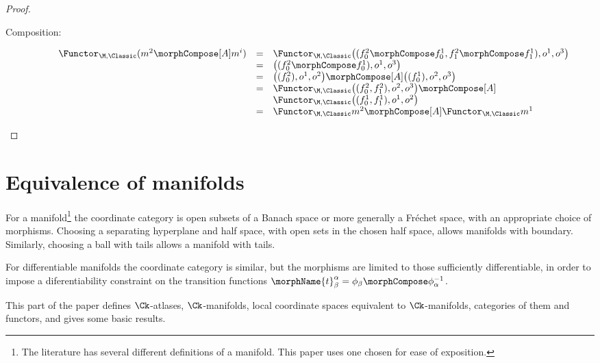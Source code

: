 \documentclass{article}
\begin{document}
\begin{theorem}
\begin{proof}
\begin{description}
\item[Composition:]
\begin{equation*}
\begin{array}{lll}
  \Functor_{\M,\Classic} (m^2 \morphCompose[A] m^i)
  & =
  &
  \Functor_{\M,\Classic}
    \bigl (
      (f_0^2 \morphCompose f_0^1, f_1^2 \morphCompose f_1^1),
      o^1,
      o^3
    \bigr )
\\*
  & =
  &
    \bigl (
      (f_0^2 \morphCompose f_0^1),
      o^1,
      o^3
    \bigr )
\\*
  & =
  &
    \bigl (
      (f_0^2),
      o^1,
      o^2
    \bigr )
    \morphCompose[A]
    \bigl (
      (f_0^1),
      o^2,
      o^3
    \bigr )
\\*
  & =
  &
  \Functor_{\M,\Classic}
    \bigl (
      (f_0^2, f_1^2),
      o^2,
      o^3
    \bigr )
  \morphCompose[A]
\\*
  &
  &
    \Functor_{\M,\Classic}
    \bigl (
      (f_0^1, f_1^1),
      o^1,
      o^2
    \bigr )
\\*
  & =
  &
  \Functor_{\M,\Classic} m^2
  \morphCompose[A]
  \Functor_{\M,\Classic} m^1
\end{array}
\end{equation*}
\end{description}
\end{proof}
\end{theorem}

\part{Equivalence of manifolds}
\label{part:man}
For a manifold\footnote{
  The literature has several different definitions of a manifold.
  This paper uses one chosen for ease of exposition.
}
the coordinate category is open subsets of a Banach space or more
generally a Fr\'echet space, with an appropriate choice of morphisms.
Choosing a separating hyperplane and half space, with open sets in the
chosen half space, allows manifolds with boundary. Similarly, choosing a
ball with tails allows a manifold with tails.

For differentiable manifolds the coordinate category is similar, but the
morphisms are limited to those sufficiently differentiable, in order to
impose a diferentiability constraint on the transition functions
$\morphName{t}^\alpha_\beta=\phi_\beta \morphCompose \phi_\alpha^{-1}$.

This part of the paper defines $\Ck$-atlases, $\Ck$-manifolds, local
coordinate spaces equivalent to $\Ck$-manifolds, categories of them and
functors, and gives some basic results.
\end{document}
